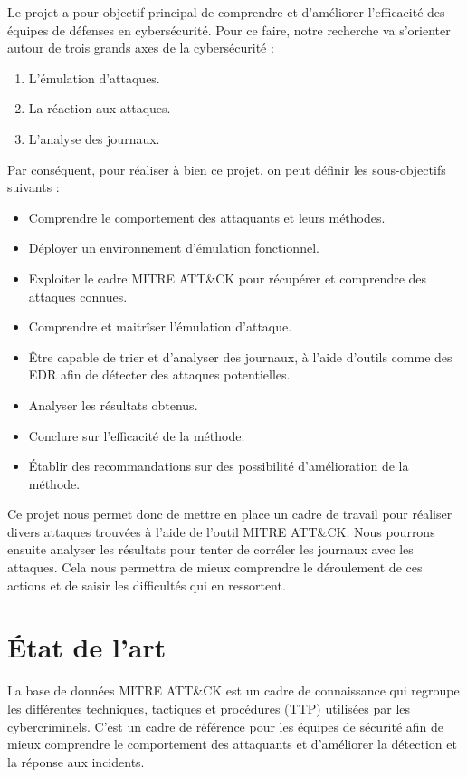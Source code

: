\documentclass[12pt,letterpaper]{article}
\begin{document}
Le projet a pour objectif principal de comprendre et d'améliorer l'efficacité des équipes de défenses en cybersécurité.
Pour ce faire, notre recherche va s'orienter autour de trois grands axes de la cybersécurité :  
\begin{enumerate}
    \item L'émulation d'attaques.
    \item La réaction aux attaques.
    \item L'analyse des journaux.
\end{enumerate}
Par conséquent, pour réaliser à bien ce projet, on peut définir les sous-objectifs suivants :
\begin{itemize}
    \item Comprendre le comportement des attaquants et leurs méthodes.
    \item Déployer un environnement d'émulation fonctionnel.
    \item Exploiter le cadre MITRE ATT\&CK pour récupérer et comprendre des attaques connues.
    \item Comprendre et maitrîser l'émulation d'attaque.
    \item Être capable de trier et d'analyser des journaux, à l'aide d'outils comme des EDR afin de détecter des attaques potentielles.
    \item Analyser les résultats obtenus.
    \item Conclure sur l'efficacité de la méthode.
    \item Établir des recommandations sur des possibilité d'amélioration de la méthode.
\end{itemize}

Ce projet nous permet donc de mettre en place un cadre de travail pour réaliser divers attaques trouvées à l'aide de l'outil MITRE ATT\&CK.
Nous pourrons ensuite analyser les résultats pour tenter de corréler les journaux avec les attaques.
Cela nous permettra de mieux comprendre le déroulement de ces actions et de saisir les difficultés qui en ressortent.

\newpage
\section{État de l'art}
La base de données MITRE ATT\&CK est un cadre de connaissance qui regroupe les différentes techniques, tactiques et procédures (TTP) utilisées par les cybercriminels. 
C'est un cadre de référence pour les équipes de sécurité afin de mieux comprendre le comportement des attaquants et d'améliorer la détection et la réponse aux incidents.
\end{document}
